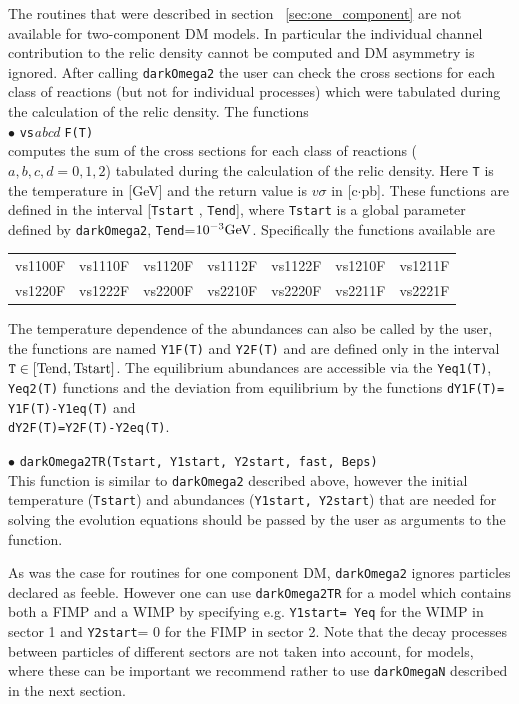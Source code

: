 \documentclass[12pt,a4paper]{article}
\begin{document}
The routines that were described in section ~\ref{sec:one_component} are not available for two-component DM models. In particular the individual channel contribution to the relic density cannot be computed and DM asymmetry is ignored. 
 After calling  {\tt  darkOmega2}  the user can check the  cross sections  
for each class of reactions (but not for individual processes) which were tabulated during the calculation of the relic density. 
The functions\\
$\bullet$ \verb|vs|{\it abcd} \verb|F(T)|\\
computes the sum of  the cross sections  
for each class of reactions ($a,b,c,d=0,1,2$) tabulated during the calculation of the relic density. 
Here  \verb|T| is the temperature in [GeV] and the 
return value is $v\sigma$ in [c$\cdot$pb].  These functions are defined in the interval [{\tt Tstart} , {\tt Tend}], where
{\tt Tstart} is a global parameter defined by \verb|darkOmega2|, {\tt Tend}=$10^{-3}{\rm GeV}$. Specifically the functions available are

\begin{center}
\begin{tabular}{ l l l l l l l }
vs1100F & vs1110F & vs1120F&vs1112F&vs1122F&vs1210F&vs1211F\\
vs1220F&vs1222F&vs2200F&vs2210F&vs2220F&vs2211F& vs2221F
\end{tabular}
\end{center} 

The  temperature dependence  of the abundances can also be called by the user, the functions are named {\tt Y1F(T)} and {\tt Y2F(T)} and are defined only in the  interval ${\tt T}\in
[\rm{Tend},\rm{Tstart}]$. The equilibrium abundances are accessible via  the  { \tt Yeq1(T)}, { \tt Yeq2(T)} functions and the deviation from equilibrium  
by the functions
 {\tt dY1F(T)= Y1F(T)-Y1eq(T)}  and \\
   { \tt dY2F(T)=Y2F(T)-Y2eq(T)}.

\noindent
$\bullet$ \verb|darkOmega2TR(Tstart, Y1start, Y2start, fast, Beps)|\\
This function is similar to \verb|darkOmega2| described above, however the initial temperature (\verb|Tstart|) and abundances (\verb|Y1start, Y2start|) that are needed for solving the evolution equations should be  passed by the user as arguments to the function. 


As was the case for routines for  one  component DM, {\tt darkOmega2}  ignores particles declared as feeble. However one can use \verb|darkOmega2TR| for a model which contains both a FIMP and a WIMP by  specifying e.g. {\tt Y1start= Yeq} for the WIMP in sector 1 and {\tt Y2start}= 0 for the  FIMP in sector 2. Note that the decay processes between particles of different sectors are not taken into account,  for
models, where these can be important we recommend rather to use \verb|darkOmegaN| described in the next section.
 
\end{document}
